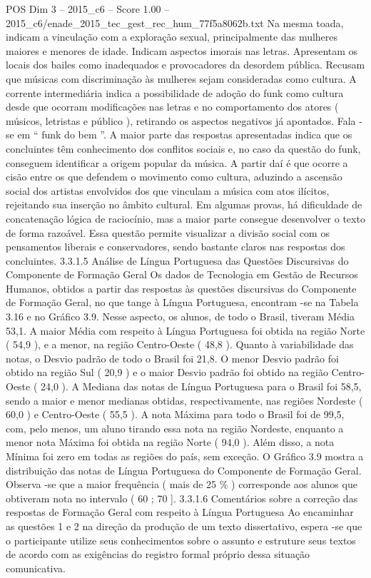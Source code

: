 \begin{textsample}{POS Dim 3 – 2015\_c6 – Score 1.00 – 2015\_c6/enade\_2015\_tec\_gest\_rec\_hum\_77f5a8062b.txt}
Na mesma toada, indicam a vinculação com a exploração sexual, principalmente das mulheres maiores e menores de idade.
Indicam aspectos imorais nas letras.
Apresentam os locais dos bailes como inadequados e provocadores da desordem pública.
Recusam que músicas com discriminação às mulheres sejam consideradas como cultura.
A corrente intermediária indica a possibilidade de adoção do funk como cultura desde que ocorram modificações nas letras e no comportamento dos atores ( músicos, letristas e público ), retirando os aspectos negativos já apontados.
Fala -se em “ funk do bem ”.
A maior parte das respostas apresentadas indica que os concluintes têm conhecimento dos conflitos sociais e, no caso da questão do funk, conseguem identificar a origem popular da música.
A partir daí é que ocorre a cisão entre os que defendem o movimento como cultura, aduzindo a ascensão social dos artistas envolvidos dos que vinculam a música com atos ilícitos, rejeitando sua inserção no âmbito cultural.
Em algumas provas, há dificuldade de concatenação lógica de raciocínio, mas a maior parte consegue desenvolver o texto de forma razoável.
Essa questão permite visualizar a divisão social com os pensamentos liberais e conservadores, sendo bastante claros nas respostas dos concluintes. 3.3.1.5 Análise de Língua Portuguesa das Questões Discursivas do Componente de Formação Geral Os dados de Tecnologia em Gestão de Recursos Humanos, obtidos a partir das respostas às questões discursivas do Componente de Formação Geral, no que tange à Língua Portuguesa, encontram -se na Tabela 3.16 e no Gráfico 3.9.
Nesse aspecto, os alunos, de todo o Brasil, tiveram Média 53,1.
A maior Média com respeito à Língua Portuguesa foi obtida na região Norte ( 54,9 ), e a menor, na região Centro-Oeste ( 48,8 ).
Quanto à variabilidade das notas, o Desvio padrão de todo o Brasil foi 21,8.
O menor Desvio padrão foi obtido na região Sul ( 20,9 ) e o maior Desvio padrão foi obtido na região Centro-Oeste ( 24,0 ).
A Mediana das notas de Língua Portuguesa para o Brasil foi 58,5, sendo a maior e menor medianas obtidas, respectivamente, nas regiões Nordeste ( 60,0 ) e Centro-Oeste ( 55,5 ).
A nota Máxima para todo o Brasil foi de 99,5, com, pelo menos, um aluno tirando essa nota na região Nordeste, enquanto a menor nota Máxima foi obtida na região Norte ( 94,0 ).
Além disso, a nota Mínima foi zero em todas as regiões do país, sem exceção.
O Gráfico 3.9 mostra a distribuição das notas de Língua Portuguesa do Componente de Formação Geral.
Observa -se que a maior frequência ( mais de 25 \% ) corresponde aos alunos que obtiveram nota no intervalo ( 60 ; 70 ]. 3.3.1.6 Comentários sobre a correção das respostas de Formação Geral com respeito à Língua Portuguesa Ao encaminhar as questões 1 e 2 na direção da produção de um texto dissertativo, espera -se que o participante utilize seus conhecimentos sobre o assunto e estruture seus textos de acordo com as exigências do registro formal próprio dessa situação comunicativa.

\end{textsample}

